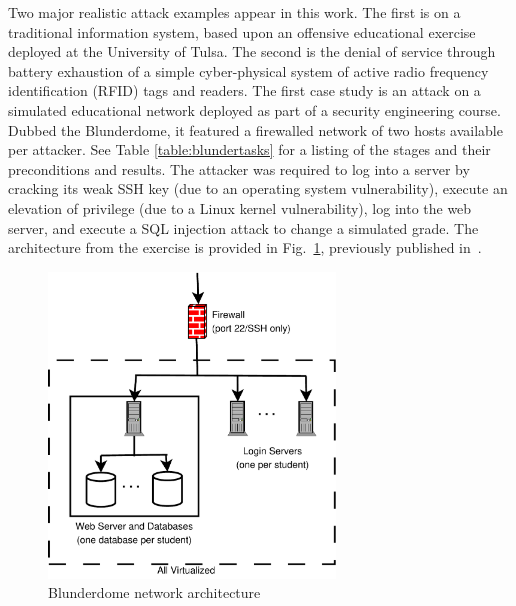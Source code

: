 Two major realistic attack examples appear in this work.
The first is on a traditional information system, based upon an offensive educational exercise
deployed at the University of Tulsa. The second is the 
denial of service through battery exhaustion of a simple
cyber-physical system of active radio frequency identification (RFID) tags and readers.
\label{sec:blunderdome}
The first case study is an attack on a simulated educational network deployed as part of a
security engineering course. Dubbed the Blunderdome, it featured a firewalled network of
two hosts available per attacker. See Table \ref{table:blundertasks} for a listing of the stages and
their preconditions and results. The attacker was required to log into a server by cracking
its weak SSH key (due to an operating system vulnerability), execute an elevation of privilege (due
to a Linux kernel vulnerability), log into the web server, and execute a SQL injection attack to
change a simulated grade. The architecture from the exercise is provided in 
Fig.~\ref{fig:blunderarch}, previously published in~\cite{louthan2010blunderdome}.

\begin{figure}
\centering
\includegraphics[width=3in]{blunderarch}
\caption{Blunderdome network architecture}
\label{fig:blunderarch}
\end{figure}

